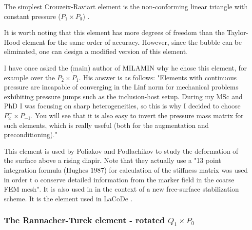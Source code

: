 \begin{remark}
The simplest Crouzeix-Raviart element is the non-conforming linear triangle 
with constant pressure ($P_1\times P_0$) \cite{cuss86}. 
\end{remark}

It is worth noting that this element has more degrees of freedom  than the 
Taylor-Hood element for the same order of accuracy. However, since the 
bubble can be eliminated, one can design a modified version of this element.


\begin{remark}
I have once asked the (main) author of MILAMIN why he chose this element, for 
example over the $P_2\times P_1$. His answer is as follows:
"Elements with continuous pressure  are incapable of converging in the Linf 
norm for mechanical problems exhibiting pressure jumps such as the inclusion-host setup. 
During my MSc and PhD I was focusing on sharp heterogeneities, so this is why I decided 
to choose $P_2^+\times P_{-1}$. 
You will see that it is also easy to invert the pressure mass matrix for such elements, 
which is really useful (both for the augmentation and preconditioning)."
\end{remark}

This element is used by Poliakov and Podlachikov \cite{popo92} to study the deformation of the surface above a rising diapir. Note that they actually use a "13 point integration formula (Hughes
1987) for calculation of the stiffness matrix was used in order
t o conserve detailed information from the marker field in
the coarse FEM mesh". 
It is also used in \cite{anmp15} in the context of a new free-surface stabilization scheme. 
It is the element used in LaCoDe \cite{demh19}.






\subsubsection{The Rannacher-Turek element - rotated $Q_1\times P_0$} \label{ss:RTq1p0}

